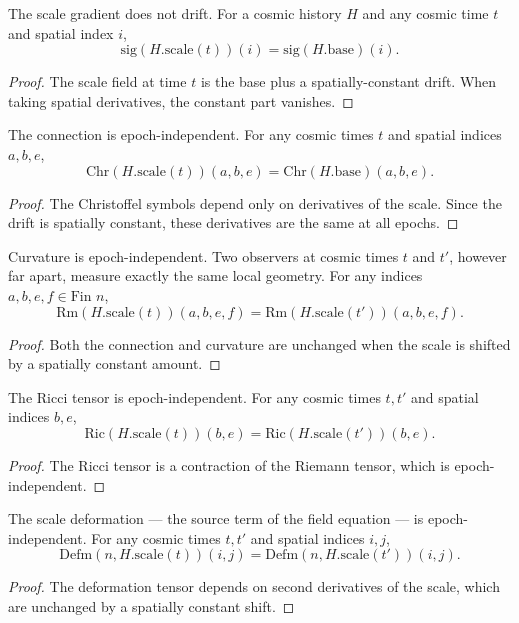 \begin{theorem}
The scale gradient does not drift. For a cosmic history $H$ and any cosmic time $t$ and spatial index $i$,
\[
\text{sig}(H.\text{scale}(t))(i) = \text{sig}(H.\text{base})(i).
\]
\begin{proof}
The scale field at time $t$ is the base plus a spatially-constant drift. When taking spatial derivatives, the constant part vanishes.
\end{proof}
\end{theorem}

\begin{theorem}
The connection is epoch-independent. For any cosmic times $t$ and spatial indices $a, b, e$,
\[
\text{Chr}(H.\text{scale}(t))(a, b, e) = \text{Chr}(H.\text{base})(a, b, e).
\]
\begin{proof}
The Christoffel symbols depend only on derivatives of the scale. Since the drift is spatially constant, these derivatives are the same at all epochs.
\end{proof}
\end{theorem}

\begin{theorem}
Curvature is epoch-independent. Two observers at cosmic times $t$ and $t'$, however far apart, measure exactly the same local geometry. For any indices $a, b, e, f \in \text{Fin } n$,
\[
\text{Rm}(H.\text{scale}(t))(a, b, e, f) = \text{Rm}(H.\text{scale}(t'))(a, b, e, f).
\]
\begin{proof}
Both the connection and curvature are unchanged when the scale is shifted by a spatially constant amount.
\end{proof}
\end{theorem}

\begin{theorem}
The Ricci tensor is epoch-independent. For any cosmic times $t, t'$ and spatial indices $b, e$,
\[
\text{Ric}(H.\text{scale}(t))(b, e) = \text{Ric}(H.\text{scale}(t'))(b, e).
\]
\begin{proof}
The Ricci tensor is a contraction of the Riemann tensor, which is epoch-independent.
\end{proof}
\end{theorem}

\begin{theorem}
The scale deformation — the source term of the field equation — is epoch-independent. For any cosmic times $t, t'$ and spatial indices $i, j$,
\[
\text{Defm}(n, H.\text{scale}(t))(i, j) = \text{Defm}(n, H.\text{scale}(t'))(i, j).
\]
\begin{proof}
The deformation tensor depends on second derivatives of the scale, which are unchanged by a spatially constant shift.
\end{proof}
\end{theorem}

